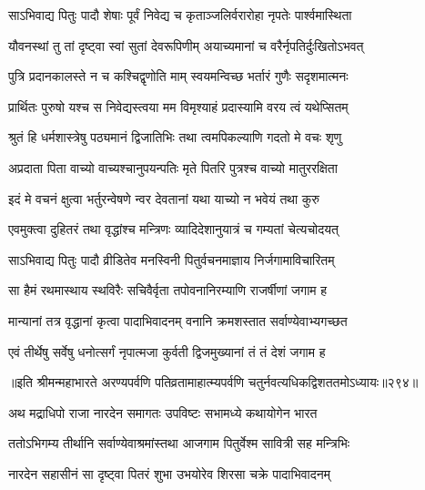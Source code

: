 \begin{center}
\twolineshloka
{साऽभिवाद्य पितुः पादौ शेषाः पूर्वं निवेद्य च}
{कृताञ्जलिर्वरारोहा नृपतेः पार्श्वमास्थिता}


\twolineshloka
{यौवनस्थां तु तां दृष्ट्वा स्वां सुतां देवरूपिणीम्}
{अयाच्यमानां च वरैर्नृपतिर्दुःखितोऽभवत्}




\twolineshloka
{पुत्रि प्रदानकालस्ते न च कश्चिद्वृणोति माम्}
{स्वयमन्विच्छ भर्तारं गुणैः सदृशमात्मनः}


\twolineshloka
{प्रार्थितः पुरुषो यश्च स निवेद्यस्त्वया मम}
{विमृश्याहं प्रदास्यामि वरय त्वं यथेप्सितम्}


\twolineshloka
{श्रुतं हि धर्मशास्त्रेषु पठ्यमानं द्विजातिभिः}
{तथा त्वमपिकल्याणि गदतो मे वचः शृणु}


\twolineshloka
{अप्रदाता पिता वाच्यो वाच्यश्चानुपयन्पतिः}
{मृते पितरि पुत्रश्च वाच्यो मातुररक्षिता}


\twolineshloka
{इदं मे वचनं क्षुत्वा भर्तुरन्वेषणे न्वर}
{देवतानां यथा याच्यो न भवेयं तथा कुरु}


\twolineshloka
{एवमुक्त्वा दुहितरं तथा वृद्धांश्च मन्त्रिणः}
{व्यादिदेशानुयात्रं च गम्यतां चेत्यचोदयत्}


\twolineshloka
{साऽभिवाद्य पितुः पादौ व्रीडितेव मनस्विनी}
{पितुर्वचनमाज्ञाय निर्जगामाविचारितम्}


\twolineshloka
{सा हैमं रथमास्थाय स्थविरैः सचिवैर्वृता}
{तपोवनानिरम्याणि राजर्षीणां जगाम ह}


\twolineshloka
{मान्यानां तत्र वृद्धानां कृत्वा पादाभिवादनम्}
{वनानि क्रमशस्तात सर्वाण्येवाभ्यगच्छत}


\twolineshloka
{एवं तीर्थेषु सर्वेषु धनोत्सर्गं नृपात्मजा}
{कुर्वती द्विजमुख्यानां तं तं देशं जगाम ह}


॥इति श्रीमन्महाभारते अरण्यपर्वणि
पतिव्रतामाहात्म्यपर्वणि चतुर्नवत्यधिकद्विशततमोऽध्यायः॥२९४॥




\twolineshloka
{अथ मद्राधिपो राजा नारदेन समागतः}
{उपविष्टः सभामध्ये कथायोगेन भारत}


\twolineshloka
{ततोऽभिगम्य तीर्थानि सर्वाण्येवाश्रमांस्तथा}
{आजगाम पितुर्वेश्म सावित्री सह मन्त्रिभिः}


\twolineshloka
{नारदेन सहासीनं सा दृष्ट्वा पितरं शुभा}
{उभयोरेव शिरसा चक्रे पादाभिवादनम्}





\end{center}

